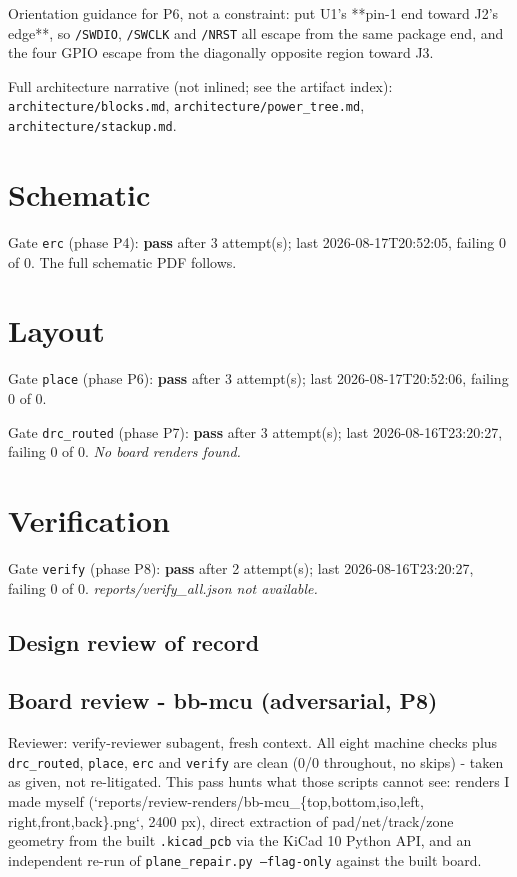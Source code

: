 \documentclass[11pt,a4paper]{article}
\begin{document}
Orientation guidance for P6, not a constraint: put U1's {*}{*}pin-1 end toward J2's edge{*}{*}, so \texttt{/SWDIO}, \texttt{/SWCLK} and \texttt{/NRST} all escape from the same package end, and the four GPIO escape from the diagonally opposite region toward J3.

Full architecture narrative (not inlined; see the artifact index): \texttt{architecture/blocks.md}, \texttt{architecture/power\_tree.md}, \texttt{architecture/stackup.md}.
\section{Schematic}
Gate \texttt{erc} (phase P4): \textbf{pass} after 3 attempt(s); last 2026-08-17T20:52:05, failing 0 of 0.
The full schematic PDF follows.

\section{Layout}
Gate \texttt{place} (phase P6): \textbf{pass} after 3 attempt(s); last 2026-08-17T20:52:06, failing 0 of 0.

Gate \texttt{drc\_routed} (phase P7): \textbf{pass} after 3 attempt(s); last 2026-08-16T23:20:27, failing 0 of 0.
\emph{No board renders found.}
\section{Verification}
Gate \texttt{verify} (phase P8): \textbf{pass} after 2 attempt(s); last 2026-08-16T23:20:27, failing 0 of 0.
\emph{reports/verify\_all.json not available.}
\subsection*{Design review of record}
\subsection*{Board review - bb-mcu (adversarial, P8)}
Reviewer: verify-reviewer subagent, fresh context. All eight machine checks plus \texttt{drc\_routed}, \texttt{place}, \texttt{erc} and \texttt{verify} are clean (0/0 throughout, no skips) - taken as given, not re-litigated. This pass hunts what those scripts cannot see: renders I made myself (`reports/review-renders/bb-mcu\_\{top,bottom,iso,left, right,front,back\}.png`, 2400 px), direct extraction of pad/net/track/zone geometry from the built \texttt{.kicad\_pcb} via the KiCad 10 Python API, and an independent re-run of \texttt{plane\_repair.py --flag-only} against the built board.
\end{document}
